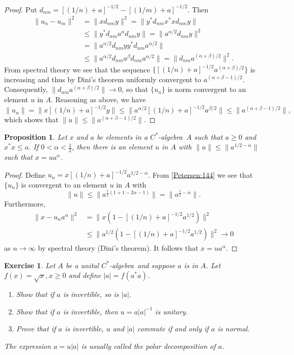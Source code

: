 \documentclass{book}
\newtheorem{exercise}{Exercise}[section]
\newtheorem{proposition}[definition]{Proposition}
\def\cstar{\(C^*\)-algebra}
\begin{document}
\begin{proof} 
  Put \(d_{nm}={[(1/n)+a]}^{-1/2}-{[(1/m)+a]}^{-1/2}\). Then
  \begin{align*}
    \|u_n-u_m\|^2&=\|xd_{nm}y\|^2= \|y^* d_{nm}x^* x d_{nm}y\|\\
    &\leq\|y^* d_{nm}a^\alpha d_{nm}y\|=\|a^{\alpha/2}d_{nm}y\|^2\\ 
    &=\|a^{\alpha/2}d_{nm}yy^* d_{nm}a^{\alpha/2}\|\\
    &\leq \|a^{\alpha/2}d_{nm}a^\beta d_{nm}a^{\alpha/2}\|=\|d_{nm}a^{(\alpha+\beta)/2}\|^2.
  \end{align*}
  From spectral theory we see that the sequence \(\{{[(1/n)+a]}^{-1/2}a^{(\alpha+\beta)/2}\}\)
  is increasing and thus by Dini's theorem uniformly convergent to \(a^{(\alpha+\beta-1)/2}\).
  Consequently, \(\|d_{nm}a^{(\alpha+\beta)/2}\|\rightarrow 0\), so that \(\{u_n\}\)
  is norm convergent to an element \(u\) in \(A\). Reasoning as above, we have
  \[
    \|u_n\|=\|x{[(1/n)+a]}^{-1/2}y\|\leq\|a^{\alpha/2}{[(1/n)+a]}^{-1/2}a^{\beta/2}\|\leq\|a^{(\alpha+\beta-1)/2}\|,
  \]
  which shows that \(\|u\|\leq\|a^{(\alpha+\beta-1)/2}\|\).
\end{proof}
\begin{proposition}\label{Petersen:145}
  Let \(x\) and \(a\) be elements in a \cstar\ \(A\) such that \(a\geq 0\) and \(x^* x\leq a\).
  If \(0<\alpha<\frac{1}{2}\), then there is an element \(u\) in \(A\) with \(\|u\|\leq\|a^{1/2-\alpha}\|\)
  such that \(x=u a^\alpha\).
\end{proposition}
\begin{proof}
  Define \(u_n=x{[(1/n)+a]}^{-1/2}a^{1/2-\alpha}\). From \ref{Petersen:144}
  we see that \(\{u_n\}\) is convergent to an element \(u\) in \(A\) with
  \[
    \|u\|\leq\|a^{\frac{1}{2}(1+1-2\alpha-1)}\|=\|a^{\frac{1}{2}-\alpha}\|.
  \]
  Furthermore,
  \begin{align*}
    \|x-u_n a^\alpha\|^2&=\|x(1-{[(1/n)+a]}^{-1/2}a^{1/2})\|^2\\
    &\leq\|a^{1/2}(1-{[(1/n)+a]}^{-1/2}a^{1/2})\|^2\rightarrow 0
  \end{align*}
  as \(n\rightarrow\infty\) by spectral theory (Dini's theorem).
  It follows that \(x=ua^\alpha\).
\end{proof}

\begin{exercise}
  Let \(A\) be a unital \cstar\ and suppose \(a\) is in \(A\). Let
  \(f(x) = \sqrt{x},x \geq 0\) and define \(|a| = f(a^*a)\).
  \begin{enumerate}
    \item Show that if \(a\) is invertible, so is \(|a|\).
    \item Show that if \(a\) is invertible, then \(u = a|a|^{-1}\) is unitary.
    \item Prove that if \(a\) is invertible, \(u\) and \(|a|\) commute if and only if \(a\) is
      normal.
  \end{enumerate}
  The expression \(a = u|a|\) is usually called the polar decomposition of \(a\).
\end{exercise}
\end{document}
